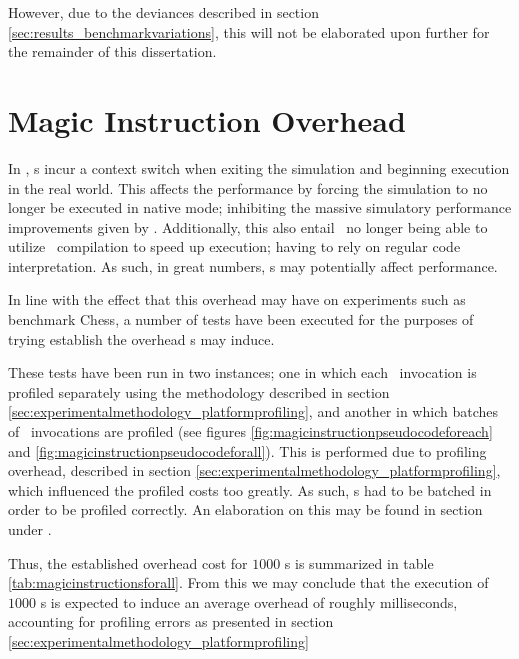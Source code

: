 However, due to the deviances described in section \ref{sec:results_benchmarkvariations}, this will not be elaborated upon further for the remainder of this dissertation.




\section{Magic Instruction Overhead}
\label{sec:results_magicinstructionoverhead}
In \dvttermsimics , \dvttermmagicinstruction s incur a context switch when exiting the simulation and beginning execution in the real world.
This affects the performance by forcing the simulation to no longer be executed in native mode; inhibiting the massive simulatory performance improvements given by \dvttermhostvirtualizationextensions .
Additionally, this also entail \dvttermsimics\ no longer being able to utilize \dvttermjit\ compilation to speed up execution; having to rely on regular code interpretation.
As such, in great numbers, \dvttermmagicinstruction s may potentially affect performance. 

In line with the effect that this overhead may have on experiments such as benchmark Chess, a number of tests have been executed for the purposes of trying establish the overhead \dvttermmagicinstruction s may induce.

These tests have been run in two instances; one in which each \dvttermmagicinstruction\ invocation is profiled separately using the methodology described in section \ref{sec:experimentalmethodology_platformprofiling}, and another in which batches of \dvttermmagicinstruction\ invocations are profiled (see figures \ref{fig:magicinstructionpseudocodeforeach} and \ref{fig:magicinstructionpseudocodeforall}).
This is performed due to profiling overhead, described in section \ref{sec:experimentalmethodology_platformprofiling}, which influenced the profiled costs too greatly.
As such, \dvttermmagicinstruction s had to be batched in order to be profiled correctly.
An elaboration on this may be found in section  under .



Thus, the established overhead cost for $1000$ \dvttermmagicinstruction s is summarized in table \ref{tab:magicinstructionsforall}.
From this we may conclude that the execution of $1000$ \dvttermmagicinstruction s is expected to induce an average overhead of roughly  milliseconds, accounting for profiling errors as presented in section \ref{sec:experimentalmethodology_platformprofiling}

